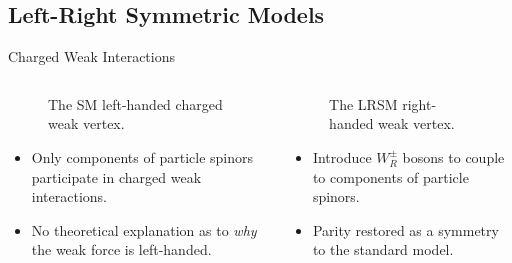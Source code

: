 \documentclass[aspectratio=169]{beamer}
\begin{document}
\subsection{Left-Right Symmetric Models}

\begin{frame}{Charged Weak Interactions}
  \begin{columns}
    \begin{column}{0.5\textwidth}
      \begin{figure}
        \centering
        
        \caption{The SM left-handed charged weak vertex.}
      \end{figure}
      \begin{itemize}
        \item Only  components of 
          particle spinors participate in charged weak interactions.
        \item No theoretical explanation as to \emph{why} 
          the weak force is left-handed.
      \end{itemize}
    \end{column}
    \begin{column}{0.5\textwidth}
      \begin{figure}
        \centering
        
        \caption{The LRSM right-handed weak vertex.}
      \end{figure}
      \begin{itemize}
        \item Introduce $W_{R}^{\pm}$ bosons to couple to  components of 
        particle spinors.
        \item Parity restored as a symmetry to the standard model.
      \end{itemize}
    \end{column}
  \end{columns}
\end{frame}
\end{document}
